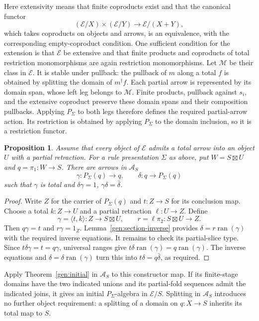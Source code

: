 \documentclass[11pt]{article}
\newtheorem{proposition}[theorem]{Proposition}
\theoremstyle{definition}
\theoremstyle{remark}
\newcommand{\ran}{\operatorname{ran}}
\begin{document}
Here extensivity means that finite coproducts exist and that the canonical
functor
\[
 (\mathscr E/X)\times(\mathscr E/Y)\longrightarrow\mathscr E/(X+Y),
\]
which takes coproducts on objects and arrows, is an equivalence, with the
corresponding empty-coproduct condition. One sufficient condition for the
extension is that $\mathscr E$ be extensive and that finite products and
coproducts of total
restriction monomorphisms are again restriction monomorphisms. Let
$\mathcal M$ be their class in $\mathscr E$. It is stable under
pullback: the pullback of $m$ along a total $f$ is obtained by splitting
the domain of $m^\dagger f$. Each partial arrow is represented by its
domain span, whose left leg belongs to $\mathcal M$. Finite products,
pullback against $s_i$, and the extensive coproduct preserve these
domain spans and their composition pullbacks. Applying $P_\Sigma$ to
both legs therefore defines the required partial-arrow action. Its
restriction is obtained by applying $P_\Sigma$ to the domain inclusion,
so it is a restriction functor.

\begin{proposition}\label{gen:typed-coding}
Assume that every object of $\mathscr E$ admits a total arrow into an
object $U$ with a partial retraction. For a rule presentation $\Sigma$
as above, put $W=S\boxtimes U$ and $q=\pi_1:W\to S$.
There are arrows in $\mathscr A_S$
\[
 \gamma:P_\Sigma(q)\longrightarrow q,
 \qquad \delta:q\longrightarrow P_\Sigma(q)
\]
such that $\gamma$ is total and
$\delta\gamma=1$, $\gamma\delta=\bar\delta$.
\end{proposition}
\begin{proof}
Write $Z$ for the carrier of $P_\Sigma(q)$ and $t:Z\to S$ for its
conclusion map. Choose a total $k:Z\to U$ and a partial retraction
$\ell:U\to Z$. Define
\[
 \gamma=\langle t,k\rangle:Z\to S\boxtimes U,
 \qquad r=\ell\pi_2:S\boxtimes U\to Z.
\]
Then $q\gamma=t$ and $r\gamma=1_Z$. Lemma~\ref{gen:section-inverse}
provides $\delta=r\ran(\gamma)$ with the required inverse equations.
It remains to check its partial-slice type. Since
$t\delta\gamma=t=q\gamma$, universal ranges give
$t\delta\ran(\gamma)=q\ran(\gamma)$. The inverse equations and
$\delta=\delta\ran(\gamma)$ turn this into
$t\delta=q\bar\delta$, as required.
\end{proof}

Apply Theorem~\ref{gen:initial} in $\mathscr A_S$ to this constructor
map. If its finite-stage domains have the two indicated unions and its
partial-fold sequences admit the indicated joins, it gives an initial
$P_\Sigma$-algebra in $\mathscr E/S$. Splitting in
$\mathscr A_S$ introduces no further object requirement: a splitting
of a domain on $q:X\to S$ inherits its total map to $S$.
\end{document}
